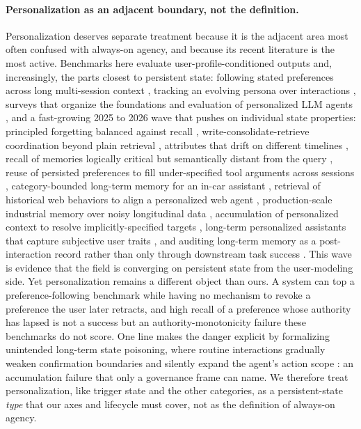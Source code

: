 \paragraph{Personalization as an adjacent boundary, not the definition.} Personalization deserves separate treatment because it is the adjacent area most often confused with always-on agency, and because its recent literature is the most active. Benchmarks here evaluate user-profile-conditioned outputs and, increasingly, the parts closest to persistent state: following stated preferences across long multi-session context \citep{zhao2025prefeval}, tracking an evolving persona over interactions \citep{jiang2025personamem}, surveys that organize the foundations and evaluation of personalized LLM agents \citep{xu2026personalizedllmpoweredagentsfoundations,salemi-etal-2024-lamp}, and a fast-growing 2025 to 2026 wave that pushes on individual state properties: principled forgetting balanced against recall \citep{uddin2026recallforgettingbenchmarkinglongterm}, write-consolidate-retrieve coordination beyond plain retrieval \citep{li2026himes}, attributes that drift on different timelines \citep{xie2026dynamicmem}, recall of memories logically critical but semantically distant from the query \citep{ding2026imlogic}, reuse of persisted preferences to fill under-specified tool arguments across sessions \citep{yoon2026mpt}, category-bounded long-term memory for an in-car assistant \citep{kirmayr2025carmem}, retrieval of historical web behaviors to align a personalized web agent \citep{cai2025personalizedwebagents}, production-scale industrial memory over noisy longitudinal data \citep{xu2026linkedinmemory}, accumulation of personalized context to resolve implicitly-specified targets \citep{lee2026polar}, long-term personalized assistants that capture subjective user traits \citep{huang2025mempal}, and auditing long-term memory as a post-interaction record rather than only through downstream task success \citep{ma2026memprobe}. This wave is evidence that the field is converging on persistent state from the user-modeling side. Yet personalization remains a different object than ours. A system can top a preference-following benchmark \citep{zhao2025prefeval} while having no mechanism to revoke a preference the user later retracts, and high recall of a preference whose authority has lapsed is not a success but an authority-monotonicity failure these benchmarks do not score. One line makes the danger explicit by formalizing unintended long-term state poisoning, where routine interactions gradually weaken confirmation boundaries and silently expand the agent's action scope \citep{xu2026toxicchats}: an accumulation failure that only a governance frame can name. We therefore treat personalization, like trigger state and the other categories, as a persistent-state \emph{type} that our axes and lifecycle must cover, not as the definition of always-on agency.

